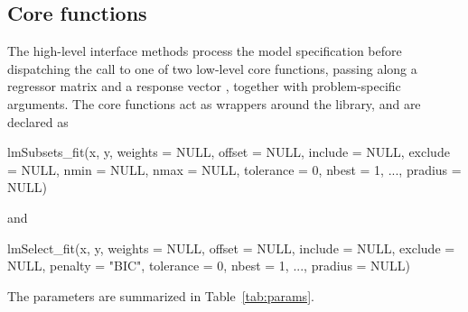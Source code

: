 \documentclass[article]{jss}
\makeatletter
\let\old@code\code
\renewcommand{\code}[1]{%
  \ifmmode\text{\old@code{#1}}%
  \else\old@code{#1}\fi}
\newcommand{\CXX}{\proglang{C++}}
\makeatother
\begin{document}
\subsection{Core functions}
\label{sec:core}

The high-level interface methods process the model specification
before dispatching the call to one of two low-level core functions,
passing along a regressor matrix  and a response vector
, together with problem-specific arguments.  The core
functions act as wrappers around the {\CXX} library, and are declared
as
%
\begin{Code}
lmSubsets_fit(x, y, weights = NULL, offset = NULL, include = NULL,
  exclude = NULL, nmin = NULL, nmax = NULL, tolerance = 0, nbest = 1, ...,
  pradius = NULL)
\end{Code}
%
and
%
\begin{Code}
lmSelect_fit(x, y, weights = NULL, offset = NULL, include = NULL,
  exclude = NULL, penalty = "BIC", tolerance = 0, nbest = 1, ...,
  pradius = NULL)
\end{Code}
%
The parameters are summarized in Table~\ref{tab:params}.
\end{document}
